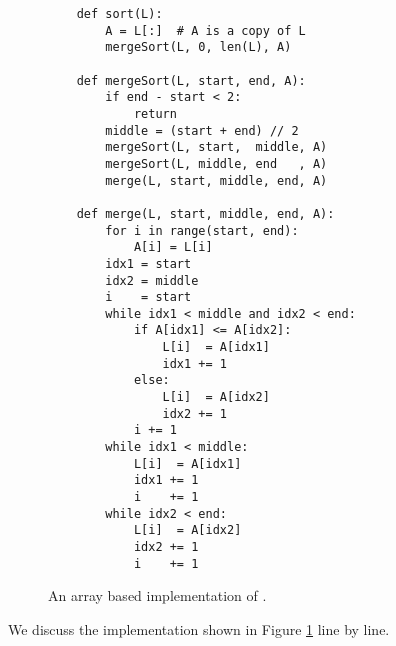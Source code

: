\begin{figure}[!ht]
  \centering
\begin{verbatim}
    def sort(L):
        A = L[:]  # A is a copy of L
        mergeSort(L, 0, len(L), A)
    
    def mergeSort(L, start, end, A):
        if end - start < 2:
            return
        middle = (start + end) // 2
        mergeSort(L, start,  middle, A)
        mergeSort(L, middle, end   , A)
        merge(L, start, middle, end, A)
    
    def merge(L, start, middle, end, A):
        for i in range(start, end):
            A[i] = L[i]
        idx1 = start
        idx2 = middle
        i    = start
        while idx1 < middle and idx2 < end:
            if A[idx1] <= A[idx2]:
                L[i]  = A[idx1]
                idx1 += 1
            else:
                L[i]  = A[idx2]
                idx2 += 1
            i += 1
        while idx1 < middle:
            L[i]  = A[idx1]
            idx1 += 1
            i    += 1
        while idx2 < end:
            L[i]  = A[idx2]
            idx2 += 1
            i    += 1
\end{verbatim}
\vspace*{-0.3cm}
  \caption{An array based implementation of .}
  \label{fig:merge-sort-array.stlx}
\end{figure}
We discuss the implementation shown in Figure \ref{fig:merge-sort-array.stlx} line by line.

